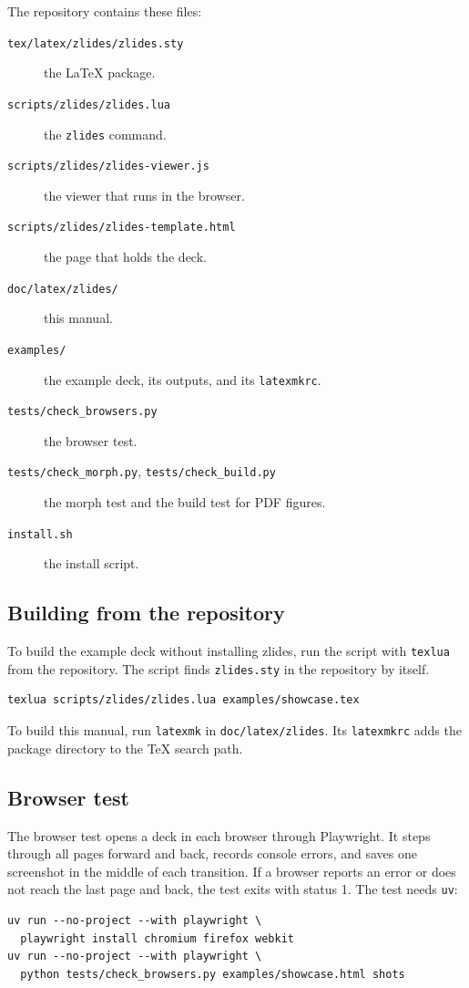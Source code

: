 \documentclass[11pt]{article}
\newcommand{\pkg}{\textsf{zlides}}
\newcommand{\cmd}[1]{\texttt{#1}}
\begin{document}
The repository contains these files:
\begin{description}
	\item[\cmd{tex/latex/zlides/zlides.sty}] the LaTeX package.
	\item[\cmd{scripts/zlides/zlides.lua}] the \cmd{zlides} command.
	\item[\cmd{scripts/zlides/zlides-viewer.js}] the viewer that runs in the browser.
	\item[\cmd{scripts/zlides/zlides-template.html}] the page that holds the deck.
	\item[\cmd{doc/latex/zlides/}] this manual.
	\item[\cmd{examples/}] the example deck, its outputs, and its \cmd{latexmkrc}.
	\item[\cmd{tests/check\_browsers.py}] the browser test.
	\item[\cmd{tests/check\_morph.py}, \cmd{tests/check\_build.py}] the morph test and the build test for PDF figures.
	\item[\cmd{install.sh}] the install script.
\end{description}

\subsection{Building from the repository}

To build the example deck without installing \pkg{}, run the script with
\cmd{texlua} from the repository. The script finds \cmd{zlides.sty} in the
repository by itself.
\begin{lstlisting}
texlua scripts/zlides/zlides.lua examples/showcase.tex
\end{lstlisting}
To build this manual, run \cmd{latexmk} in \cmd{doc/latex/zlides}. Its
\cmd{latexmkrc} adds the package directory to the TeX search path.

\subsection{Browser test}

The browser test opens a deck in each browser through Playwright. It steps through
all pages forward and back, records console errors, and saves one screenshot in
the middle of each transition. If a browser reports an error or does not reach the
last page and back, the test exits with status 1. The test needs \cmd{uv}:
\begin{lstlisting}
uv run --no-project --with playwright \
  playwright install chromium firefox webkit
uv run --no-project --with playwright \
  python tests/check_browsers.py examples/showcase.html shots
\end{lstlisting}
\end{document}
